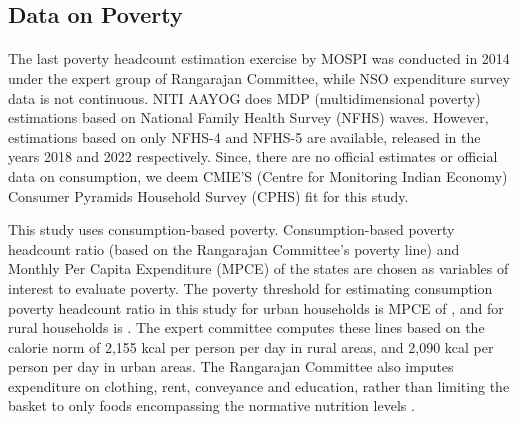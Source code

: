 \documentclass [12pt]{article}
\begin{document}
\newpage
\restoregeometry
\subsection{Data on Poverty}

\paragraph{} The last poverty headcount estimation exercise by MOSPI was conducted in 2014 under the expert group of Rangarajan Committee, while NSO expenditure survey data is not continuous. NITI AAYOG does MDP (multidimensional poverty) estimations based on National Family Health Survey (NFHS) waves. However, estimations based on only NFHS-4 and NFHS-5 are available, released in the years 2018 and 2022 respectively. Since, there are no official estimates or official data on consumption, we deem CMIE'S (Centre for Monitoring Indian Economy) Consumer Pyramids Household Survey (CPHS) fit for this study.

\text This study uses consumption-based poverty. Consumption-based poverty headcount ratio (based on the Rangarajan Committee's poverty line) and Monthly Per Capita Expenditure (MPCE) of the states are chosen as variables of interest to evaluate poverty. The poverty threshold for estimating consumption poverty headcount ratio in this study for urban households is MPCE of , and for rural households is  . The expert committee computes these lines based on the calorie norm of 2,155 kcal per person per day in rural areas, and 2,090 kcal per person per day in urban areas. The Rangarajan Committee also imputes expenditure on clothing, rent, conveyance and education, rather than limiting the basket to only foods encompassing the normative nutrition levels \parencite{rangarajan2014}.
\end{document}
